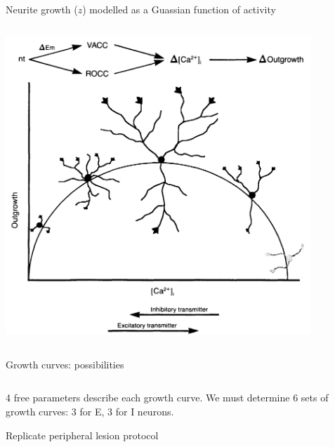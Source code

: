 \begin{frame}[t]{Neurite growth (\(z\)) modelled as a Guassian function of activity}
  \vspace{0.4cm}
  \begin{columns}
    \begin{column}{0.5\textwidth}
      \centering
      \includegraphics[width=0.9\textwidth]{99_images/lipton1989.png}%
    \end{column}
    \begin{column}{0.5\textwidth}
      \centering
      
    \end{column}
  \end{columns}
\end{frame}
\begin{frame}[t]{Growth curves: possibilities}
  \vspace{0.4cm}
  \begin{columns}
    \begin{column}{0.5\textwidth}
      \centering
      
    \end{column}
    \begin{column}{0.5\textwidth}
      \centering
      
    \end{column}
  \end{columns}
  \begin{center}
    4 free parameters describe each growth curve. We must determine 6 sets of growth curves: 3 for E, 3 for I neurons.
  \end{center}
\end{frame}
\begin{frame}[c]{Replicate peripheral lesion protocol}
  \begin{figure}[h]
    \centering
    
  \end{figure}
\end{frame}
